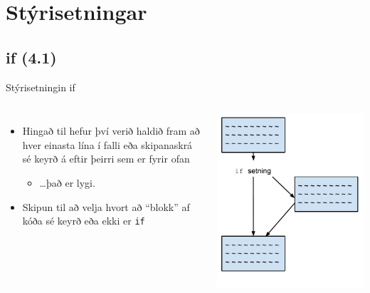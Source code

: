 \documentclass{beamer}
\begin{document}
\section{Stýrisetningar}

\subsection{if (4.1)}

\begin{frame}{Stýrisetningin if}
\begin{columns}
\begin{itemize}
 \item Hingað til hefur því verið haldið fram að hver einasta lína í falli eða skipanaskrá sé keyrð á eftir þeirri sem er fyrir ofan \pause
 \begin{itemize}
  \item \ldots það er lygi. \pause
 \end{itemize}
 \item Skipun til að velja hvort að ``blokk'' af kóða sé keyrð eða ekki er \texttt{if}
\end{itemize}
\begin{center}
 \includegraphics[width=0.8\linewidth]{Pics/if}
\end{center}
\end{columns}
\end{frame}
\end{document}
